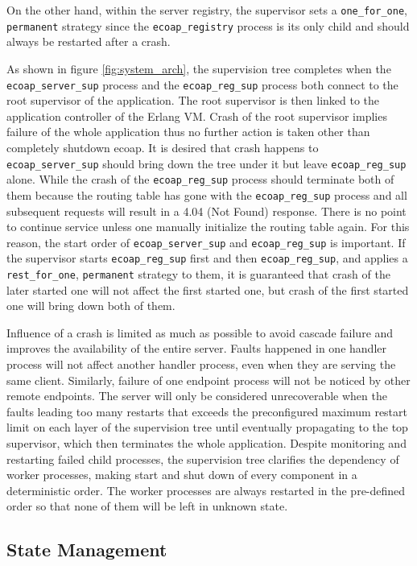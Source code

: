 On the other hand, within the server registry, the supervisor sets a \verb|one_for_one|, \verb|permanent| strategy since the \verb|ecoap_registry| process is its only child and should always be restarted after a crash. 

As shown in figure \ref{fig:system_arch}, the supervision tree completes when the \verb|ecoap_server_sup| process and the \verb|ecoap_reg_sup| process both connect to the root supervisor of the application. The root supervisor is then linked to the application controller of the Erlang VM. Crash of the root supervisor implies failure of the whole application thus no further action is taken other than completely shutdown ecoap. It is desired that crash happens to \verb|ecoap_server_sup| should bring down the tree under it but leave \verb|ecoap_reg_sup| alone. While the crash of the \verb|ecoap_reg_sup| process should terminate both of them because the routing table has gone with the \verb|ecoap_reg_sup| process and all subsequent requests will result in a 4.04 (Not Found) response. There is no point to continue service unless one manually initialize the routing table again. For this reason, the start order of \verb|ecoap_server_sup| and \verb|ecoap_reg_sup| is important. If the supervisor starts \verb|ecoap_reg_sup| first and then \verb|ecoap_reg_sup|, and applies a \verb|rest_for_one|, \verb|permanent| strategy to them, it is guaranteed that crash of the later started one will not affect the first started one, but crash of the first started one will bring down both of them. 

Influence of a crash is limited as much as possible to avoid cascade failure and improves the availability of the entire server. Faults happened in one handler process will not affect another handler process, even when they are serving the same client. Similarly, failure of one endpoint process will not be noticed by other remote endpoints. The server will only be considered unrecoverable when the faults leading too many restarts that exceeds the preconfigured maximum restart limit on each layer of the supervision tree until eventually propagating to the top supervisor, which then terminates the whole application. Despite monitoring and restarting failed child processes, the supervision tree clarifies the dependency of worker processes, making start and shut down of every component in a deterministic order. The worker processes are always restarted in the pre-defined order so that none of them will be left in unknown state. 

\subsection{State Management}\label{state_management}

